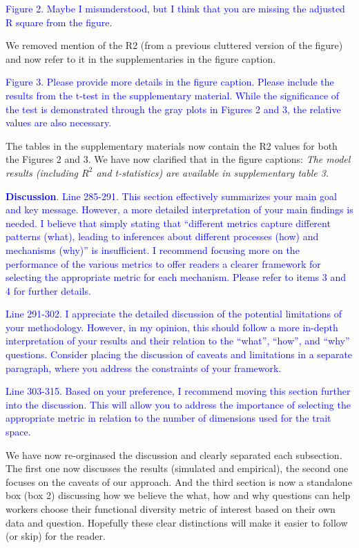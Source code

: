 \documentclass[
]{article}
\begin{document}
\textcolor{blue}{Figure 2. Maybe I misunderstood, but I think that you are missing the adjusted R square from the figure.}

We removed mention of the R2 (from a previous cluttered version of the figure) and now refer to it in the supplementaries in the figure caption.

\textcolor{blue}{Figure 3. Please provide more details in the figure caption. Please include the results from the t-test in the supplementary material.
While the significance of the test is demonstrated through the gray plots in Figures 2 and 3, the relative values are also necessary.}

The tables in the supplementary materials now contain the R2 values for both the Figures 2 and 3.
We have now clarified that in the figure captions:
\textit{The model results (including $R^{2}$ and t-statistics) are available in supplementary table 3.}

\textcolor{blue}{\textbf{Discussion}.}
\textcolor{blue}{Line 285-291. This section effectively summarizes your main goal and key message.
However, a more detailed interpretation of your main findings is needed.
I believe that simply stating that ``different metrics capture different patterns (what), leading to inferences about different processes (how) and mechanisms (why)'' is insufficient.
I recommend focusing more on the performance of the various metrics to offer readers a clearer framework for selecting the appropriate metric for each mechanism.
Please refer to items 3 and 4 for further details.}

\textcolor{blue}{Line 291-302.
I appreciate the detailed discussion of the potential limitations of your methodology.
However, in my opinion, this should follow a more in-depth interpretation of your results and their relation to the ``what'', ``how'', and ``why'' questions.
Consider placing the discussion of caveats and limitations in a separate paragraph, where you address the constraints of your framework.}

\textcolor{blue}{Line 303-315.
Based on your preference, I recommend moving this section further into the discussion.
This will allow you to address the importance of selecting the appropriate metric in relation to the number of dimensions used for the trait space.}

We have now re-orginased the discussion and clearly separated each subsection.
The first one now discusses the results (simulated and empirical), the second one focuses on the caveats of our approach.
And the third section is now a standalone box (box 2) discussing how we believe the what, how and why questions can help workers choose their functional diversity metric of interest based on their own data and question.
Hopefully these clear distinctions will make it easier to follow (or skip) for the reader.
\end{document}
